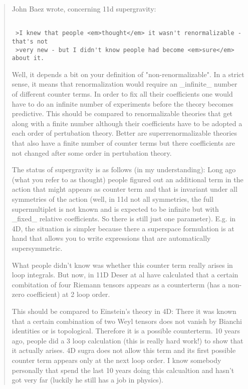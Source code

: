 \begin{quote}
John Baez wrote, concerning 11d supergravity:


\begin{verbatim}

 >I knew that people <em>thought</em> it wasn't renormalizable - that's not 
 >very new - but I didn't know people had become <em>sure</em> about it.
\end{verbatim}
    

Well, it depends a bit on your definition of "non-renormalizable". In a strict
sense, it means that renormalization would require an _infinite_ number
of different counter terms. In order to fix all their coefficients
one would have to do an infinite number of experiments before the
theory becomes predictive. This should be compared to renormalizable
theories that get along with a finite number although their coefficients
have to be adopted a each order of pertubation theory. Better are
superrenormalizable theories that also have a finite number of counter
terms but there coefficients are not changed after some order in
pertubation theory. 

The status of supergravity is as follows (in my understanding): Long ago
(what you refer to as thought) people figured out an additional
term in the action that might appears as counter term and that is 
invariant under all symmetries of the action (well, in 11d not
all symmetries, the full supermultiplet is not known and is expected
to be infinite but with _fixed_ relative coefficients. So there
is still just one parameter). E.g. in 4D, the situation is simpler because
there a superspace formulation is at hand that allows you to write expressions
that are automatically supersymmetric.

What people didn't know was whether this counter term really arises in
loop integrals. But now, in 11D Deser at al have calculated that a
certain combitation of four Riemann tensors appears as a counterterm
(has a non-zero coefficient) at 2 loop order.

This should be compared to Einstein's theory in 4D: There it was known
that a certain combination of two Weyl tensors does not vanish
by Bianchi identities or is topological. Therefore it is a possible
counterterm. 10 years ago, people did a 3 loop calculation (this is
really hard work!) to show that it actually arises. 4D sugra does not 
allow this term and its first possible counter term appears only at the 
next loop order. I know somebody personally that spend the last 10 years
doing this calcualtion and hasn't got very far (luckily he still has a 
job in physics).


\end{quote}
